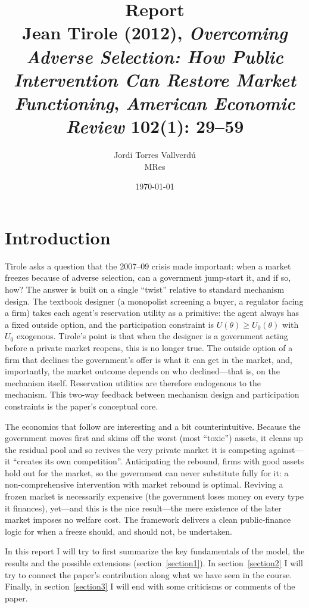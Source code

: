 \documentclass[11pt]{article}
\title{\textbf{Report}\\[0.4em]
\large Jean Tirole (2012), \emph{Overcoming Adverse Selection: How Public
Intervention Can Restore Market Functioning}, \emph{American Economic Review}
102(1): 29--59}
\author{Jordi Torres Vallverd\'u \\ \small MRes}
\date{\today}
\theoremstyle{definition}
\theoremstyle{plain}
\begin{document}
\maketitle

\section{Introduction}

Tirole asks a question that the 2007--09 crisis made important: when a market
freezes because of adverse selection, can a government jump-start it, and
if so, how? The answer is built on a single ``twist'' relative to standard
mechanism design. The textbook designer (a monopolist screening a buyer, a
regulator facing a firm) takes each agent's reservation utility as a
primitive: the agent always has a fixed outside option, and the participation
constraint is $U(\theta)\ge U_0(\theta)$ with $U_0$ exogenous. Tirole's point is
that when the designer is a government acting before a private market reopens,
this is no longer true. The outside option of a firm that declines the
government's offer is what it can get in the market, and, importantly, the market
outcome depends on who declined---that is, on the mechanism itself.
Reservation utilities are therefore endogenous to the mechanism. This
two-way feedback between mechanism design and participation constraints is the
paper's conceptual core.

The economics that follow are interesting and a bit counterintuitive. Because the
government moves first and skims off the worst (most ``toxic'') assets, it
cleans up the residual pool and so revives the very private market it is
competing against---it ``creates its own competition''. Anticipating the rebound, firms with good assets hold out for the market, so the government can never substitute fully for it: a non-comprehensive intervention with market rebound is optimal. Reviving a
frozen market is necessarily expensive (the government loses money on every type
it finances), yet---and this is the nice result---the mere existence
of the later market imposes no welfare cost. The framework 
delivers a clean public-finance logic for when a freeze should, and should not,
be undertaken. 

In this report I will try to first summarize the key fundamentals of the model, the results and the possible extensions (section~\ref{section1}).  In section~\ref{section2} I will try to connect the paper's contribution along what we have seen in the course. Finally, in section~\ref{section3} I will end with some criticisms or comments of the paper.
\end{document}
